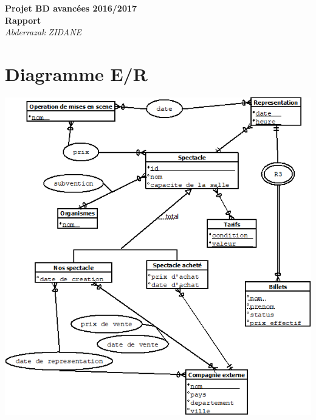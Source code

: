 \documentclass[10pt]{report}
\begin{document}
\begin{titlepage}
   \begin{center}
   	  \Large\textbf{Projet BD avancées 2016/2017}\\
      \Large\textbf{Rapport}\\
      \large\textit{Abderrazak ZIDANE}
   \end{center}
\end{titlepage}

\chapter{Diagramme E/R}
\includegraphics[width=15cm]{ER_Diagramme.png}
\end{document}
